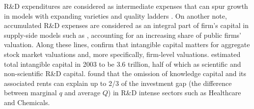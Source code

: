 \documentclass[12pt, letterpaper]{article}
\begin{document}
R\&D expenditures are considered as intermediate expenses that can spur growth in models with expanding varieties \citep{Romer1990-tw} and quality ladders \citep{Grossman1991-pz, Atkeson2019-wz}. On another note, accumulated R\&D expenses are considered as an integral part of firm's capital in supply-side models such as \cite{Belo2013-ys}, accounting for an increasing share of public firms' valuation. Along these lines, \cite{Hall2001-ni, McGrattan2001-kc, Vitorino2014-yd, Eisfeldt2020-ec, Li2014-zp} confirm that intangible capital matters for aggregate stock market valuations and, more specifically, firm-level valuations. \cite{Corrado2009-kd} estimated total intangible capital in 2003 to be 3.6 trillion, half of which as scientific and non-scientific R\&D capital. \cite{Crouzet2022-ic} found that the omission of knowledge capital and its associated rents can explain up to 2/3 of the investment gap (the difference between marginal $q$ and average $Q$) in R\&D intense sectors such as Healthcare and Chemicals.



\end{document}
